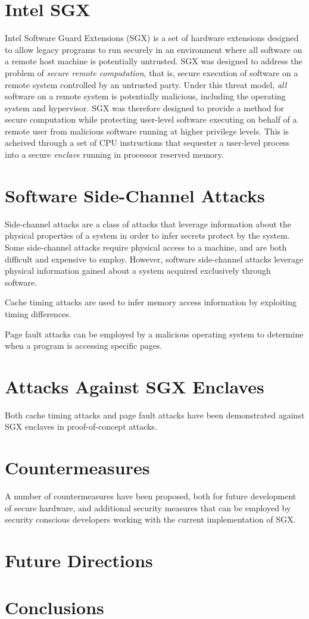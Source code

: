 \section{Intel SGX}

Intel Software Guard Extensions (SGX) is a set of hardware extensions designed to allow legacy programs to run securely in an environment where all software on a remote host machine is potentially untrusted. SGX was designed to address the problem of \emph{secure remote computation}, that is, secure execution of software on a remote system controlled by an untrusted party. Under this threat model, \emph{all} software on a remote system is potentially malicious, including the operating system and hypervisor. SGX was therefore designed to provide a method for secure computation while protecting user-level software executing on behalf of a remote user from malicious software running at higher privilege levels. This is acheived through a set of CPU instructions that sequester a user-level process into a secure \emph{enclave} running in processor reserved memory. 

\section{Software Side-Channel Attacks}

Side-channel attacks are a class of attacks that leverage information about the physical properties of a system in order to infer secrets protect by the system. Some side-channel attacks require physical access to a machine, and are both difficult and expensive to employ. However, software side-channel attacks leverage physical information gained about a system acquired exclusively through software.

Cache timing attacks are used to infer memory access information by exploiting timing differences.

Page fault attacks can be employed by a malicious operating system to determine when a program is accessing specific pages.

\section{Attacks Against SGX Enclaves}

Both cache timing attacks and page fault attacks have been demonstrated against SGX enclaves in proof-of-concept attacks. 

\section{Countermeasures}

A number of countermeasures have been proposed, both for future development of secure hardware, and additional security measures that can be employed by security conscious developers working with the current implementation of SGX.

\section{Future Directions}

\section{Conclusions}
